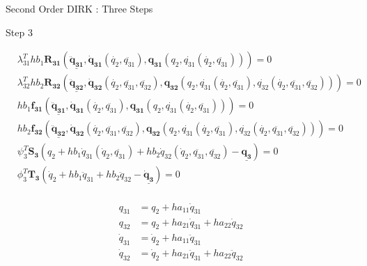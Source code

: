 \documentclass{beamer}
\begin{document}
\begin{frame}[allowframebreaks]{Second Order DIRK : Three Steps}
{\begin{block}{Step 3}
  \begin{minipage}{1.0\textwidth}
    \begin{minipage}{0.7\textwidth}
      \begin{equation}\nonumber
        \begin{split}
          &\lambda_{31}^T h b_1 \mathbf{R_{31}}\left(\underline{\mathbf{\ddot{q}_{31}}},
          \mathbf{\dot{q}_{31}}(\dot{q_2},\ddot{q_{31}}),
              \mathbf{{q}_{31}}(q_2,\dot{q_{31}}(\dot{q_2},\ddot{q_{31}}))\right) = 0 \\
          &\lambda_{32}^T h b_2  \mathbf{R_{32}}\left(\underline{\mathbf{\ddot{q}_{32}}},
              \mathbf{\dot{q}_{32}}(\dot{q_2},\ddot{q_{31}},\ddot{q_{32}}),
          \mathbf{{q}_{32}}(q_2,\dot{q_{31}}(\dot{q_2},\ddot{q_{31}}),\dot{q_{32}}(\dot{q_2},\ddot{q_{31}},\ddot{q_{32}}))\right) = 0 \\
          &h b_1 \mathbf{f_{31}}\left(\underline{\mathbf{\ddot{q}_{31}}},
          \mathbf{\dot{q}_{31}}(\dot{q_2},\ddot{q_{31}}),
              \mathbf{{q}_{31}}(q_2,\dot{q_{31}}(\dot{q_2},\ddot{q_{31}}))\right) = 0 \\
          &h b_2 \mathbf{f_{32}}\left(\underline{\mathbf{\ddot{q}_{32}}},
              \mathbf{\dot{q}_{32}}(\dot{q_2},\ddot{q_{31}},\ddot{q_{32}}),
          \mathbf{{q}_{32}}(q_2,\dot{q_{31}}(\dot{q_2},\ddot{q_{31}}),\dot{q_{32}}(\dot{q_2},\ddot{q_{31}},\ddot{q_{32}}))\right) = 0\\
          &\psi_3^T \mathbf{S_3}(q_2 + h b_1 \dot{q}_{31}(\dot{q}_2,\ddot{q_{31}}) +  h b_2 \dot{q}_{32}(\dot{q}_2,\ddot{q_{31}},\ddot{q_{32}}) - \underline{\mathbf{q_3}} ) = 0\\
          &\phi_3^T \mathbf{T_3}(\dot{q}_2 + h b_1 \ddot{q}_{31} +  h b_2 \ddot{q}_{32} - \underline{\mathbf{\dot{q}_3}} ) = 0\\
        \end{split}
      \end{equation}
    \end{minipage}
    \begin{minipage}{0.3\textwidth}
      \begin{equation}\nonumber
        \begin{split}
          q_{31} &= q_2 + h a_{11} \dot{q}_{31} \\
          q_{32} &= q_2 + h a_{21} \dot{q}_{31} + h a_{22} \dot{q}_{32} \\
          \dot{q}_{31} &= \dot{q}_2 + h a_{11} \ddot{q}_{31} \\
          \dot{q}_{32} &= \dot{q}_2 + h a_{21} \ddot{q}_{31} + h a_{22} \ddot{q}_{32} \\
        \end{split}
      \end{equation}
    \end{minipage}
  \end{minipage}
\end{block}
}


\end{frame}
\end{document}
